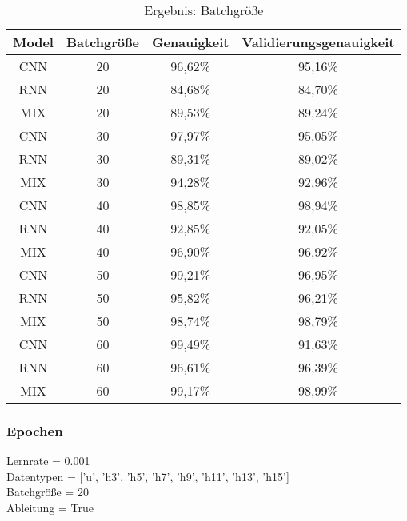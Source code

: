         \begin{table}[H]
            \centering
            \begin{tabular}{|c|c|c|c|}
                \hline
                Model & Batchgröße & Genauigkeit & Validierungsgenauigkeit \\
                \hline
                CNN & 20 & 96,62\% & 95,16\% \\
                \hline
                RNN & 20 & 84,68\% & 84,70\% \\ 
                \hline
                MIX & 20 & 89,53\% & 89,24\% \\ 
                \hline
                \hline
                CNN & 30 & 97,97\% & 95,05\% \\ 
                \hline
                RNN & 30 & 89,31\% & 89,02\% \\ 
                \hline
                MIX & 30 & 94,28\% & 92,96\% \\ 
                \hline
                \hline
                CNN & 40 & 98,85\% & 98,94\% \\ 
                \hline
                RNN & 40 & 92,85\% & 92,05\% \\
                \hline
                MIX & 40 & 96,90\% & 96,92\% \\ 
                \hline
                \hline
                CNN & 50 & 99,21\% & 96,95\% \\ 
                \hline
                RNN & 50 & 95,82\% & 96,21\% \\ 
                \hline
                MIX & 50 & 98,74\% & 98,79\% \\ 
                \hline
                \hline
                CNN & 60 & 99,49\% & 91,63\% \\ 
                \hline
                RNN & 60 & 96,61\% & 96,39\% \\ 
                \hline
                MIX & 60 & 99,17\% & 98,99\% \\
                \hline
            \end{tabular}
            \caption{Ergebnis: Batchgröße}
            \label{tabl:ErgebnisBatchsize}
        \end{table}

    \subsubsection{Epochen}

        Lernrate = 0.001\\
        \noindent
        Datentypen = ['u', 'h3', 'h5', 'h7', 'h9', 'h11', 'h13', 'h15']\\
        \noindent
        Batchgröße = 20\\
        \noindent
        Ableitung = True\\

